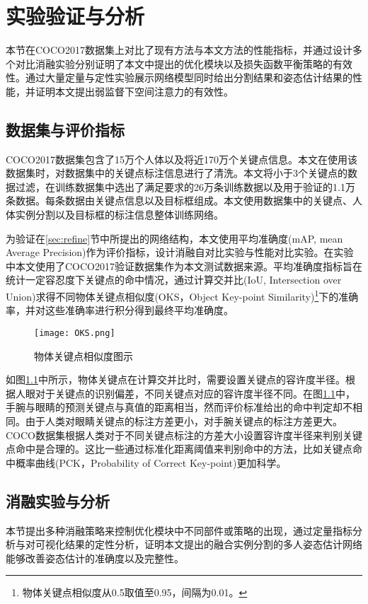 \chapter{实验验证与分析}
\label{cha:exp}
本节在COCO2017数据集上对比了现有方法与本文方法的性能指标，并通过设计多个对比消融实验分别证明了本文中提出的优化模块以及损失函数平衡策略的有效性。通过大量定量与定性实验展示网络模型同时给出分割结果和姿态估计结果的性能，并证明本文提出弱监督下空间注意力的有效性。
\section{数据集与评价指标}
\label{sec:dataset}
COCO2017数据集\cite{lin2014microsoft}包含了15万个人体以及将近170万个关键点信息。本文在使用该数据集时，对数据集中的关键点标注信息进行了清洗。本文将小于3个关键点的数据过滤，在训练数据集中选出了满足要求的26万条训练数据以及用于验证的1.1万条数据。每条数据由关键点信息以及目标框组成。本文使用数据集中的关键点、人体实例分割以及目标框的标注信息整体训练网络。

为验证在\ref{sec:refine}节中所提出的网络结构，本文使用平均准确度(mAP, mean Average Precision)\cite{zhu2004recall}作为评价指标，设计消融自对比实验与性能对比实验。在实验中本文使用了COCO2017验证数据集作为本文测试数据来源。平均准确度指标旨在统计一定容忍度下关键点的命中情况，通过计算交并比(IoU, Intersection over Union)求得不同物体关键点相似度(OKS，Object Key-point Similarity)\footnote{物体关键点相似度从0.5取值至0.95，间隔为0.01。}下的准确率，并对这些准确率进行积分得到最终平均准确度\cite{ruggero2017benchmarking}。

\begin{figure}
	\centering
	\texttt{[image: OKS.png]}
	\caption{物体关键点相似度图示\cite{ruggero2017benchmarking}}
	\label{fig:oksfigure}
\end{figure}

如图\ref{fig:oksfigure}中所示，物体关键点在计算交并比时，需要设置关键点的容许度半径。根据人眼对于关键点的识别偏差，不同关键点对应的容许度半径不同。在图\ref{fig:oksfigure}中，手腕与眼睛的预测关键点与真值的距离相当，然而评价标准给出的命中判定却不相同。由于人类对眼睛关键点的标注方差更小，对手腕关键点的标注方差更大。COCO数据集根据人类对于不同关键点标注的方差大小设置容许度半径来判别关键点命中是合理的。这比一些通过标准化距离阈值来判别命中的方法，比如关键点命中概率曲线\cite{andriluka20142d}(PCK，Probability of Correct Key-point)更加科学。

\section{消融实验与分析}
\label{sec:ablation}
本节提出多种消融策略来控制优化模块中不同部件或策略的出现，通过定量指标分析与对可视化结果的定性分析，证明本文提出的融合实例分割的多人姿态估计网络能够改善姿态估计的准确度以及完整性。
